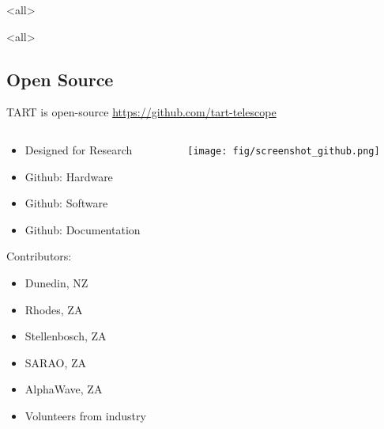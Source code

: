 \documentclass[ignorenonframetext]{beamer}
\begin{document}
\mode<all>
{
\begin{frame}[plain]
\end{frame}
}
\mode<all>{\usebackgroundtemplate{}}


\subsection*{Open Source}


% 

\begin{frame}{TART is open-source}
  \centering\url{https://github.com/tart-telescope}
 \begin{columns}
  \begin{column}{0.4\linewidth}
    \begin{itemize}
      \item Designed for Research
      \item Github: Hardware
      \item Github: Software
      \item Github: Documentation
    \end{itemize}
    
    Contributors:
    \begin{itemize}
      \item Dunedin, NZ
      \item Rhodes, ZA
      \item Stellenbosch, ZA
      \item SARAO, ZA
      \item AlphaWave, ZA
      \item Volunteers from industry
    \end{itemize}
  \end{column}
  \begin{column}{0.6\linewidth}
    \texttt{[image: fig/screenshot\_github.png]}
  \end{column}
  \end{columns}
\end{frame}
\end{document}
